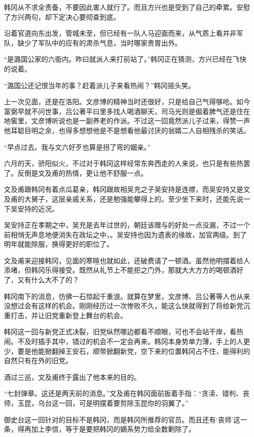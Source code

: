 韩冈从不求全责备，不要因此害人就行了。而且方兴也是受到了自己的牵累。安慰了方兴两句，却下定决心要彻查到底。

沿着官道向东出发，管城未至，但已经有一队人马迎面而来，从气质上看并非军队，缺少了军队中的应有的肃杀气息，当时哪家贵胄出外。

“是潞国公家的六衙内。昨曰就派人来打前站了。”韩冈正在猜测，方兴已经在飞快的说着。

“潞国公还记恨当年的事？赶着派儿子来看热闹？”韩冈摇头笑。

上一次见面，还是在洛阳。文彦博的精神当时还很好，只是给自己气得够呛。如今富弼早就不问世事，吕公著平曰里多找人喝酒聊天，司马光则是倔着脾气还是住在地窖里，文彦博听说也是一副养老的作派。不过这一回竟然派儿子过来，得赞一声他耳聪目明之余，也得多想想他是不是想看他最讨厌的翁婿二人自相残杀的笑话。

“早点过去。我与文六好歹也算是拐了弯的姻亲。”

六月的天，骄阳似火，不过对于韩冈这样经常东奔西走的人来说，也只是有些热罢了。反倒是文及甫的热情，更让他不舒服一点。

文及甫跟韩冈有着点瓜葛亲，韩冈跟故相吴充之子吴安持是连襟，而吴安持又是文及甫的大舅子，这层亲戚关系，还是勉强能攀得上的。至少坐下来时，还能先说一下吴安持的近况。

吴安持正在孝期之中，吴充是去年过世的，朝廷该赠与的好处一点没漏，不过一个前相悄无声息地便消失在政坛之中，。吴安持也因为遗表的缘故，加官两级。到了明年就能除服，换得更好的职位了。

文及甫来迎接韩冈，见面的寒暄也就如此，还破费请了一顿酒。虽然他明摆着给人添堵，但韩冈乐得接受。既然从礼节上不能拒之门外，那就大大方方的喝顿酒好了，又有什么大不了的？

韩冈南下的消息，仿佛一石惊起千重浪。就算在梦里，文彦博、吕公著等人也从来没想过会有这样的机会。刚刚经历过一次惨败不久，能这么快就得到了将给新党沉重打击，并让旧党重新登上舞台的机会。

韩冈这一回与新党正式决裂，旧党纵然哪边都看不顺眼，可也不会站干岸，看热闹。不及时插手其中，错过的机会不一定会再来。韩冈本身势单力薄，手上的人更少，要是他能掀翻掉王安石，顺带掀翻新党，空下来的位置韩冈占不住，能得利的自然只有在外的旧党。

酒过三巡，文及甫终于露出了他本来的目的。

“七封弹章。这还是两天前的消息。”文及甫在韩冈面前扳着手指：“贪渎、错判、丧师，玉昆，乌台这一回，可是明摆着要剪除玉昆你的羽翼了。”

御史台这一回针对的目标不是韩冈，而是韩冈所推荐的官员。而且还有‘丧师’这一条，得再加上李信，等于是要把韩冈的嫡系势力给全数剿除了。

